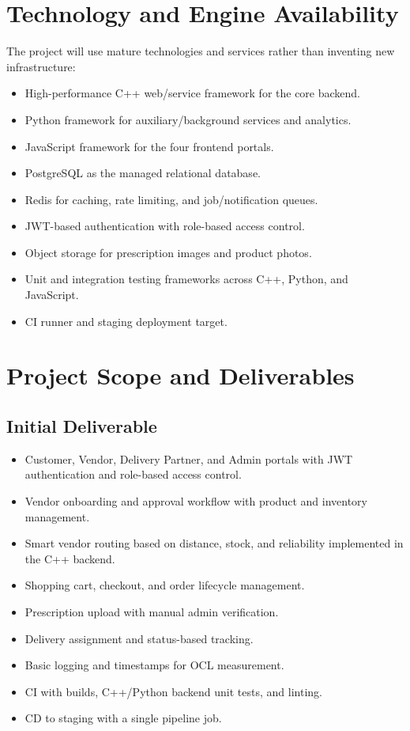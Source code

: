 \documentclass[11pt,a4paper]{article}
\begin{document}
\section{Technology and Engine Availability}

The project will use mature technologies and services rather than inventing new infrastructure:

\begin{itemize}[leftmargin=1.5em]
    \item High-performance C++ web/service framework for the core backend.
    \item Python framework for auxiliary/background services and analytics.
    \item JavaScript framework for the four frontend portals.
    \item PostgreSQL as the managed relational database.
    \item Redis for caching, rate limiting, and job/notification queues.
    \item JWT-based authentication with role-based access control.
    \item Object storage for prescription images and product photos.
    \item Unit and integration testing frameworks across C++, Python, and JavaScript.
    \item CI runner and staging deployment target.
\end{itemize}

\section{Project Scope and Deliverables}

\subsection{Initial Deliverable}

\begin{itemize}[leftmargin=1.5em]
    \item Customer, Vendor, Delivery Partner, and Admin portals with JWT authentication and
    role-based access control.
    \item Vendor onboarding and approval workflow with product and inventory management.
    \item Smart vendor routing based on distance, stock, and reliability implemented in the C++ backend.
    \item Shopping cart, checkout, and order lifecycle management.
    \item Prescription upload with manual admin verification.
    \item Delivery assignment and status-based tracking.
    \item Basic logging and timestamps for OCL measurement.
    \item CI with builds, C++/Python backend unit tests, and linting.
    \item CD to staging with a single pipeline job.
\end{itemize}
\end{document}
